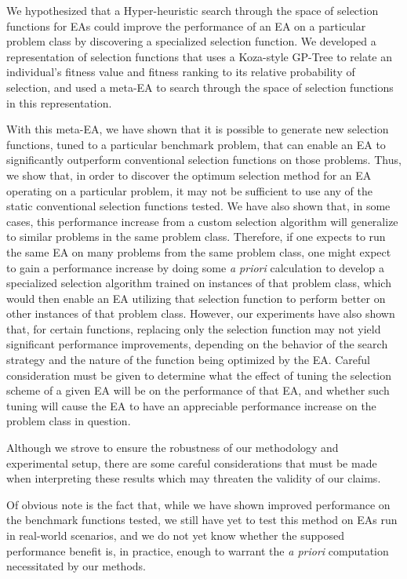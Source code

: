 \documentclass[times,12pt,titlepage]{mstogs}
\begin{document}
\begin{ThesisBody}
\label{Conclusion}
We hypothesized that a Hyper-heuristic search through the space of selection functions for EAs could improve the performance of an EA on a particular problem class by discovering a specialized selection function. We developed a representation of selection functions that uses a Koza-style GP-Tree to relate an individual's fitness value and fitness ranking to its relative probability of selection, and used a meta-EA to search through the space of selection functions in this representation. 

With this meta-EA, we have shown that it is possible to generate new selection functions, tuned to a particular benchmark problem, that can enable an EA to significantly outperform conventional selection functions on those problems. Thus, we show that, in order to discover the optimum selection method for an EA operating on a particular problem, it may not be sufficient to use any of the static conventional selection functions tested. We have also shown that, in some cases, this performance increase from a custom selection algorithm will generalize to similar problems in the same problem class. Therefore, if one expects to run the same EA on many problems from the same problem class, one might expect to gain a performance increase by doing some \textit{a priori} calculation to develop a specialized selection algorithm trained on instances of that problem class, which would then enable an EA utilizing that selection function to perform better on other instances of that problem class. However, our experiments have also shown that, for certain functions, replacing only the selection function may not yield significant performance improvements, depending on the behavior of the search strategy and the nature of the function being optimized by the EA. Careful consideration must be given to determine what the effect of tuning the selection scheme of a given EA will be on the performance of that EA, and whether such tuning will cause the EA to have an appreciable performance increase on the problem class in question. 

\label{Threats to Validity}
Although we strove to ensure the robustness of our methodology and experimental setup, there are some careful considerations that must be made when interpreting these results which may threaten the validity of our claims.

Of obvious note is the fact that, while we have shown improved performance on the benchmark functions tested, we still have yet to test this method on EAs run in real-world scenarios, and we do not yet know whether the supposed performance benefit is, in practice, enough to warrant the \textit{a priori} computation necessitated by our methods.


\end{ThesisBody}
\end{document}
